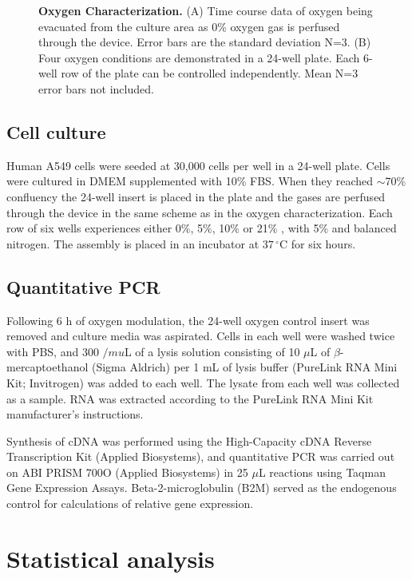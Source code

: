\documentclass[10pt,letterpaper]{article}
\begin{document}
\begin{figure}[h]
\caption{
{\bf Oxygen Characterization.} 
(A) Time course data of oxygen being evacuated from the culture area as 0\% oxygen gas is perfused through the device.
Error bars are the standard deviation N=3.
(B) Four oxygen conditions are demonstrated in a 24-well plate.
Each 6-well row of the plate can be controlled independently.  
Mean N=3 error bars not included.
}
\label{fig2}
\end{figure}

\subsection*{Cell culture}

Human A549 cells were seeded at 30,000 cells per well in a 24-well plate.
Cells were cultured in DMEM supplemented with 10\% FBS.
When they reached $\sim$70\% confluency the 24-well insert is placed in the plate and the gases are perfused through the device in the same scheme as in the oxygen characterization.
Each row of six wells experiences either 0\%, 5\%, 10\% or 21\% , with 5\%  and balanced nitrogen.
The assembly is placed in an incubator at $37\,^{\circ}$C for six hours. 


\subsection*{Quantitative PCR}

Following 6 h of oxygen modulation, the 24-well oxygen control insert was removed and culture media was aspirated.
Cells in each well were washed twice with PBS, and 300 $/mu$L of a lysis solution consisting of 10 $\mu$L of $\beta$-mercaptoethanol (Sigma Aldrich) per 1 mL of lysis buffer (PureLink RNA Mini Kit; Invitrogen) was added to each well.
The lysate from each well was collected as a sample.
RNA was extracted according to the PureLink RNA Mini Kit manufacturer’s instructions.

Synthesis of cDNA was performed using the High-Capacity cDNA Reverse Transcription Kit (Applied Biosystems), and quantitative PCR was carried out on ABI PRISM 700O (Applied Biosystems) in 25 $\mu$L reactions using Taqman Gene Expression Assays.
Beta-2-microglobulin (B2M) served as the endogenous control for calculations of relative gene expression.

\section*{Statistical analysis}
\end{document}
